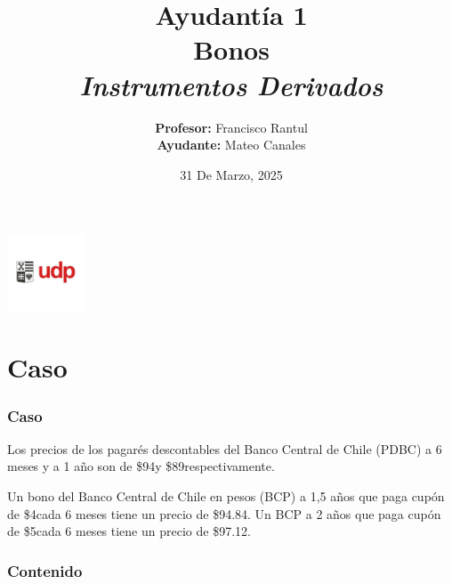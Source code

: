 \documentclass{beamer}
\title{Ayudantía 1 \\ Bonos \\ \large\textit{Instrumentos Derivados}}
\author{
  \texorpdfstring{
    \textbf{Profesor:} Francisco Rantul \\[0.3em]
    \textbf{Ayudante:} Mateo Canales
  }{Profesor: Francisco Rantul, Ayudante: Mateo Canales}
}
\institute{Universidad Diego Portales}
\date{31 De Marzo, 2025}
\newcommand{\Fseis}{94}     %
\newcommand{\Funo}{89}      %
\newcommand{\PunoCinco}{94.84}  %
\newcommand{\Pdos}{97.12}       %
\newcommand{\CunoCinco}{4}  %
\newcommand{\Cdos}{5}       %
\begin{document}
\begin{frame}
    \titlepage
    \vfill
    \centering
    \includegraphics[width=2.3118cm]{../imagenes/logo.png}
  \end{frame}
\section{Caso}
  \begin{frame}
    
  \frametitle{Caso}

  Los precios de los pagarés descontables del Banco Central de Chile (PDBC)
  a 6 meses y a 1 año son de \$\Fseis y \$\Funo respectivamente. 
  
  Un bono del Banco Central de Chile en pesos (BCP) a 1,5 años que paga cupón de 
  \$\CunoCinco cada 6 meses tiene un precio de \$\PunoCinco. Un BCP a 2 años que paga
  cupón de \$\Cdos cada 6 meses tiene un precio de \$\Pdos.

  \end{frame}
\begin{frame}
    \frametitle{Contenido}
    \tableofcontents
\end{frame}
\end{document}
